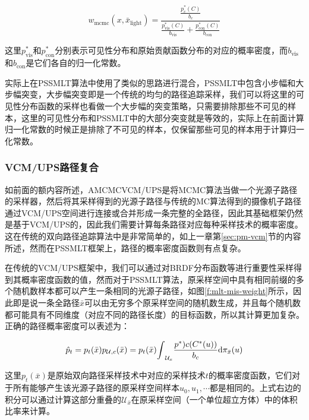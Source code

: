 \begin{equation}
	w_{\text{mcmc}}(x,\bar{x}_{\text{light}})=\frac{\frac{p^{*}_c(C)}{b_c}}{\frac{p^{*}_{\text{vis}}(C)}{b_{\text{vis}}}+\frac{p^{*}_{\text{con}}(C)}{b_{\text{con}}}}
\end{equation}

\noindent 这里$p^{*}_{\text{vis}}$和$p^{*}_{\text{con}}$分别表示可见性分布和原始贡献函数分布的对应的概率密度，而$b_{\text{vis}}$和$b_{\text{con}}$是它们各自的归一化常数。

实际上在PSSMLT算法\cite{a:ASimpleandRobustMutationStrategyfortheMetropolisLightTransportAlgorithm}中使用了类似的思路进行混合，PSSMLT中包含小步幅和大步幅突变，大步幅突变即是一个传统的均匀的路径追踪采样，我们可以将这里的可见性分布函数的采样也看做一个大步幅的突变策略，只需要排除那些不可见的样本，这里的可见性分布和PSSMLT中的大部分突变就是等效的，实际上在前面计算归一化常数的时候正是排除了不可见的样本，仅保留那些可见的样本用于计算归一化常数。




\subsubsection{VCM/UPS路径复合}
如前面的额内容所述，AMCMCVCM/UPS是将MCMC算法当做一个光源子路径的采样器，然后将其采样得到的光源子路径与传统的MC算法得到的摄像机子路径通过VCM/UPS空间进行连接或合并形成一条完整的全路径，因此其基础框架仍然是基于VCM/UPS的，因此我们需要计算每条路径对应每种采样技术的概率密度。这在传统的双向路径追踪算法中是非常简单的，如上一章第\ref{sec:pm-vcm}节的内容所述，然而在PSSMLT框架上，路径的概率密度函数则有点复杂。

在传统的VCM/UPS框架中，我们可以通过对BRDF分布函数等进行重要性采样得到其概率密度函数的值，然而对于PSSMLT算法，原采样空间中具有相同前缀的多个随机数样本都可以产生一条相同的光源子路径，如图\ref{f:mlt-mis-weight}所示，因此即是说一条全路径$\bar{x}$可以由无穷多个原采样空间的随机数生成，并且每个随机数都可能具有不同维度（对应不同的路径长度）的目标函数，所以其计算更加复杂。正确的路径概率密度可以表述为：

\begin{equation}
	\hat{p}_t=p_t(\bar{x})p_{\mathcal{U},c}(\bar{x})=p_t(\bar{x}){\rm \int}_{\mathcal{U}_x}\frac{p^{*})c(C^{*}(u))}{b_c}{\rm d}\pi_{\bar{x}}(u)
\end{equation}

\noindent 这里$p_t(\bar{x})$是原始双向路径采样技术中对应的采样技术$t$的概率密度函数，它们对于所有能够产生该光源子路径的原采样空间样本$u_0,u_1,\cdots$都是相同的。上式右边的积分可以通过计算这部分重叠的$\mathcal{U}_{\bar{x}}$在原采样空间（一个单位超立方体）中的体积比率来计算。

